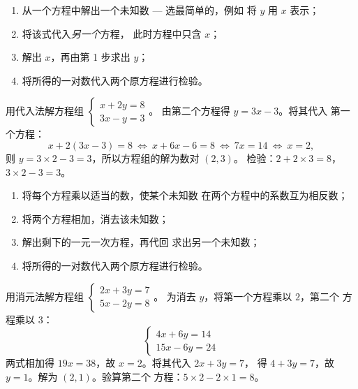 \begin{method}[代入法]\label{met:g10:lines:substitution}
\begin{enumerate}
  \item 从一个方程中解出一个未知数 --- 选最简单的，例如
        将 $y$ 用 $x$ 表示；
  \item 将该式代入\emph{另一个}方程，
        此时方程中只含 $x$；
  \item 解出 $x$，再由第 1 步求出 $y$；
  \item 将所得的一对数代入两个原方程进行检验。
\end{enumerate}
\end{method}

\begin{example}\label{ex:g10:lines:substitution}
用代入法解方程组 $\begin{cases} x + 2y = 8 \\ 3x - y = 3 \end{cases}$。
由第二个方程得 $y = 3x - 3$。将其代入
第一个方程：
\[
x + 2(3x - 3) = 8
\ \Longleftrightarrow\
x + 6x - 6 = 8
\ \Longleftrightarrow\
7x = 14
\ \Longleftrightarrow\
x = 2 ,
\]
则 $y = 3 \times 2 - 3 = 3$，所以方程组的解为数对 $(2, 3)$。
检验：$2 + 2 \times 3 = 8$，$3 \times 2 - 3 = 3$。
\end{example}

\begin{method}[消元法]\label{met:g10:lines:elimination}
\begin{enumerate}
  \item 将每个方程乘以适当的数，使某个未知数
        在两个方程中的系数互为相反数；
  \item 将两个方程相加，消去该未知数；
  \item 解出剩下的一元一次方程，再代回
        求出另一个未知数；
  \item 将所得的一对数代入两个原方程进行检验。
\end{enumerate}
\end{method}

\begin{example}\label{ex:g10:lines:elimination}
用消元法解方程组 $\begin{cases} 2x + 3y = 7 \\ 5x - 2y = 8 \end{cases}$。
为消去 $y$，将第一个方程乘以 $2$，第二个
方程乘以 $3$：
\[
\begin{cases}
4x + 6y = 14 \\
15x - 6y = 24
\end{cases}
\]
两式相加得 $19x = 38$，故 $x = 2$。将其代入 $2x + 3y = 7$，
得 $4 + 3y = 7$，故 $y = 1$。解为 $(2, 1)$。验算第二个
方程：$5 \times 2 - 2 \times 1 = 8$。
\end{example}

